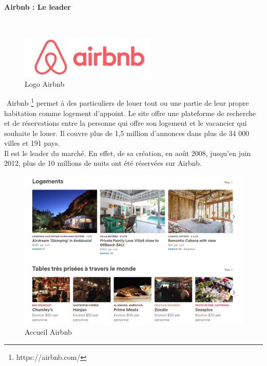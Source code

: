 \paragraph{Airbnb : Le leader}
$ $
\begin{figure}[H]
\begin{center}
\includegraphics[width=6.5cm]{images/concurrent/airbnb3.png}
\end{center}
\caption{Logo Airbnb}
\end{figure}
$ $
Airbnb  \footnote{https://airbnb.com/} permet à des particuliers de louer tout ou une partie de leur propre habitation comme logement d'appoint. Le site offre une plateforme de recherche et de réservations entre la personne qui offre son logement et le vacancier qui souhaite le louer. Il couvre plus de 1,5 million d'annonces dans plus de 34 000 villes et 191 pays.
\\Il est le leader du marché. En effet, de sa création, en août 2008, jusqu'en juin 2012, plus de 10 millions de nuits ont été réservées sur Airbnb.
\newpage
\begin{figure}[H]
\begin{center}
\includegraphics[width=17.5cm]{images/concurrent/airbnb1.png}
\end{center}
\caption{Accueil Airbnb}
\end{figure}

